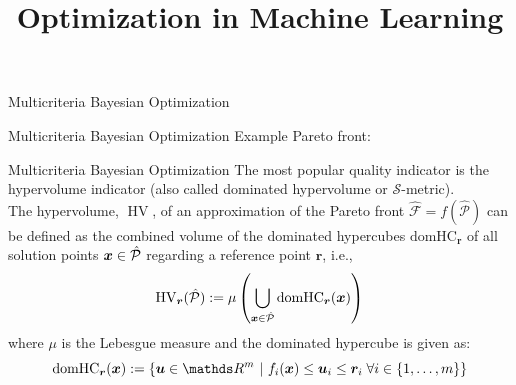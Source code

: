 \documentclass[11pt,compress,t,notes=noshow, xcolor=table]{beamer}
\title{Optimization in Machine Learning}
\begin{document}

\begin{framev}[fs=small]{Multicriteria Bayesian Optimization}
\end{framev}


\begin{framev}{Multicriteria Bayesian Optimization}
Example Pareto front:
\vfill
{}
\end{framev}


\begin{framev}[fs=small]{Multicriteria Bayesian Optimization}
The most popular quality indicator is the hypervolume indicator (also called dominated hypervolume or $\mathcal{S}$-metric).\\
\vspace{1em}
The hypervolume, $\operatorname{HV}$, of an approximation of the Pareto front $\hat{\mathcal{F}} = f(\hat{\mathcal{P}})$ can be defined as the combined volume of the dominated hypercubes $\text{domHC}_{\bm{r}}$ of all solution points $\bm{x} \in \hat{\mathcal{P}}$ regarding a reference point $\bm{r}$, i.e.,
$$
\operatorname{HV}_{\bm{r}}(\hat{\mathcal{P}}) := \mu\left(\bigcup_{\bm{x} \in \hat{\mathcal{P}}}\text{domHC}_{\bm{r}}(\bm{x})\right)
$$
where $\mu$ is the Lebesgue measure and the dominated hypercube is given as:
$$
\text{domHC}_{\bm{r}}(\xv) := \{\uv \in \R^m~|~ f_i(\xv) \leq \uv_i \leq \bm{r}_i\;\forall i \in \{1, \dots, m\}\}
$$
\end{framev}
\end{document}
